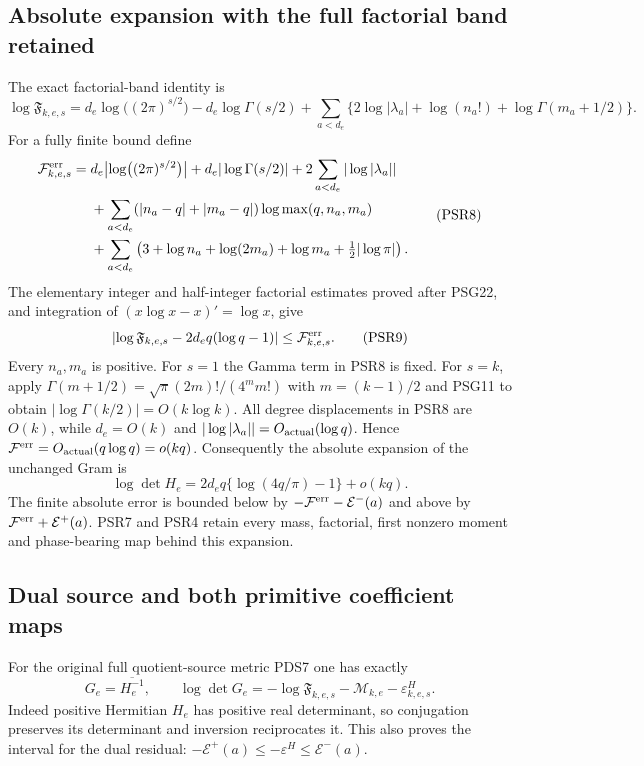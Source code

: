 \documentclass[10pt]{article}
\begin{document}
\subsection{Absolute expansion with the full factorial band retained}
The exact factorial-band identity is
\[
 \log\mathfrak F_{k,e,s}
 =d_e\log\bigl((2\pi)^{s/2}\bigr)-d_e\log\Gamma(s/2)
   +\sum_{a<d_e}\{2\log|\lambda_a|+
                  \log(n_a!)+\log\Gamma(m_a+1/2)\}.\tag{PSR7}
\]
For a fully finite bound define
\[
\begin{split}
 \mathcal F^{\rm err}_{k,e,s}
 ={}&d_e\bigl|\log\bigl((2\pi)^{s/2}\bigr)\bigr|+d_e|\log\Gamma(s/2)|
                   +2\sum_{a<d_e}|\log|\lambda_a||\\
 &+\sum_{a<d_e}(|n_a-q|+|m_a-q|)\log\max(q,n_a,m_a)\\
 &+\sum_{a<d_e}\left(3+\log n_a+\log(2m_a)+\log m_a
                                     +\tfrac12|\log\pi|\right).
\end{split}\tag{PSR8}
\]
The elementary integer and half-integer factorial estimates proved
after PSG22, and integration of $(x\log x-x)'=\log x$, give
\[
 \left|\log\mathfrak F_{k,e,s}-2d_eq(\log q-1)\right|
                   \le\mathcal F^{\rm err}_{k,e,s}.
\tag{PSR9}
\]
Every $n_a,m_a$ is positive. For $s=1$ the Gamma term in PSR8 is
fixed. For $s=k$, apply
$\Gamma(m+1/2)=\sqrt\pi(2m)!/(4^m m!)$ with $m=(k-1)/2$ and
PSG11 to obtain $|\log\Gamma(k/2)|=O(k\log k)$.
All degree displacements in PSR8 are $O(k)$, while $d_e=O(k)$
and $|\log|\lambda_a||=O_{\rm actual}(\log q)$.
Hence $\mathcal F^{\rm err}=O_{\rm actual}(q\log q)=o(kq)$.
Consequently the absolute expansion of the unchanged Gram is
\[
 \log\det H_e
 =2d_eq\{\log(4q/\pi)-1\}+o(kq).\tag{PSR10}
\]
The finite absolute error is bounded below by
$-\mathcal F^{\rm err}-\mathcal E^-(a)$ and above by
$\mathcal F^{\rm err}+\mathcal E^+(a)$. PSR7 and PSR4 retain
every mass, factorial, first nonzero moment and phase-bearing map
behind this expansion.

\subsection{Dual source and both primitive coefficient maps}
For the original full quotient-source metric PDS7 one has exactly
\[
 G_e=\overline{H_e^{-1}},\qquad
 \log\det G_e=-\log\mathfrak F_{k,e,s}-\mathcal M_{k,e}
                         -\varepsilon^H_{k,e,s}.\tag{PSR11}
\]
Indeed positive Hermitian $H_e$ has positive real determinant,
so conjugation preserves its determinant and inversion reciprocates it.
This also proves the interval for the dual residual:
$-\mathcal E^+(a)\le-\varepsilon^H\le\mathcal E^-(a)$.
\end{document}
